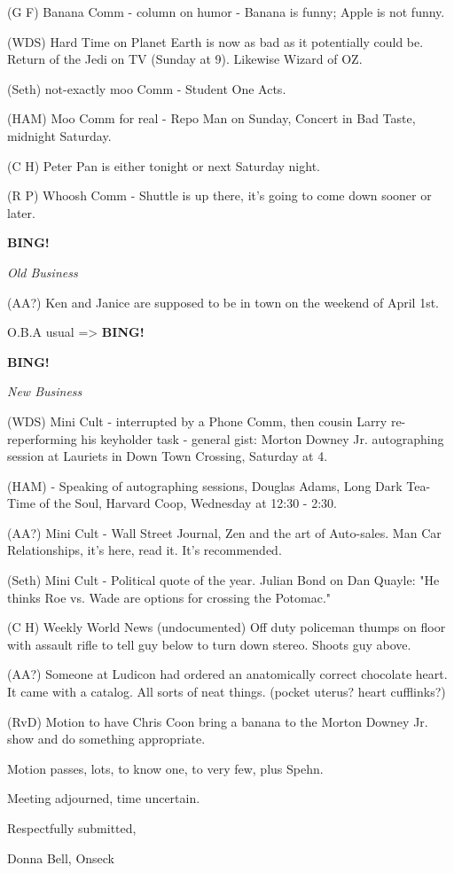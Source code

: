 \documentclass[12pt]{article}
\newcommand{\bing}{{\bf BING!} }
\newcommand{\goto}[1]{\bing \vskip 12pt \centerline{{\em{#1}}}}
\begin{document}
(G F) Banana Comm - column on humor - Banana is funny; Apple is not funny.

(WDS) Hard Time on Planet Earth is now as bad as it potentially could be. Return of the Jedi on TV (Sunday at 9). Likewise Wizard of OZ.

(Seth) not-exactly moo Comm - Student One Acts.

(HAM) Moo Comm for real - Repo Man on Sunday, Concert in Bad Taste, midnight Saturday.

(C H) Peter Pan is either tonight or next Saturday night.

(R P) Whoosh Comm - Shuttle is up there, it's going to come down sooner or later.

\goto{Old Business}

(AA?) Ken and Janice are supposed to be in town on the weekend of April 1st.

O.B.A usual => \bing

\goto{New Business}

(WDS) Mini Cult - interrupted by a Phone Comm, then cousin Larry re-reperforming his keyholder task - general gist: Morton Downey Jr. autographing session at Lauriets in Down Town Crossing, Saturday at 4.

(HAM) - Speaking of autographing sessions, Douglas Adams, Long Dark Tea-Time of the Soul, Harvard Coop, Wednesday at 12:30 - 2:30.

(AA?) Mini Cult - Wall Street Journal, Zen and the art of Auto-sales. Man Car Relationships, it's here, read it.  It's recommended.

(Seth) Mini Cult - Political quote of the year.  Julian Bond on Dan Quayle: "He thinks Roe vs. Wade are options for crossing the Potomac."

(C H) Weekly World News (undocumented)  Off duty policeman thumps on floor with assault rifle to tell guy below to turn down stereo. Shoots guy above.

(AA?) Someone at Ludicon had ordered an anatomically correct chocolate heart. It came with a catalog.  All sorts of neat things. (pocket uterus? heart cufflinks?)

(RvD) Motion to have Chris Coon bring a banana to the Morton Downey Jr. show and do something appropriate.

Motion passes, lots, to know one, to very few, plus Spehn.

\vspace{12pt}

\noindent
Meeting adjourned, time uncertain.

\vspace{18pt}

\centerline{Respectfully submitted,}
\centerline{Donna Bell, Onseck}
\end{document}
